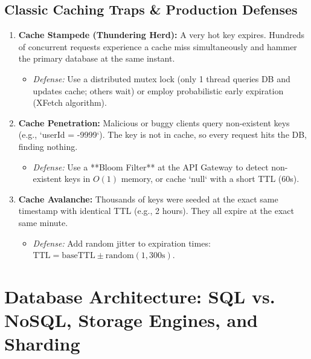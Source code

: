 \documentclass[10pt,journal,compsoc,onecolumn]{IEEEtran}
\begin{document}
\subsection{Classic Caching Traps \& Production Defenses}
\begin{enumerate}
    \item \textbf{Cache Stampede (Thundering Herd):} A very hot key expires. Hundreds of concurrent requests experience a cache miss simultaneously and hammer the primary database at the same instant.
    \begin{itemize}
        \item \emph{Defense:} Use a distributed mutex lock (only 1 thread queries DB and updates cache; others wait) or employ probabilistic early expiration (XFetch algorithm).
    \end{itemize}
    \item \textbf{Cache Penetration:} Malicious or buggy clients query non-existent keys (e.g., `userId = -9999`). The key is not in cache, so every request hits the DB, finding nothing.
    \begin{itemize}
        \item \emph{Defense:} Use a **Bloom Filter** at the API Gateway to detect non-existent keys in $O(1)$ memory, or cache `null` with a short TTL (60s).
    \end{itemize}
    \item \textbf{Cache Avalanche:} Thousands of keys were seeded at the exact same timestamp with identical TTL (e.g., 2 hours). They all expire at the exact same minute.
    \begin{itemize}
        \item \emph{Defense:} Add random jitter to expiration times: $\text{TTL} = \text{baseTTL} \pm \text{random}(1, 300\text{s})$.
    \end{itemize}
\end{enumerate}

\section{Database Architecture: SQL vs. NoSQL, Storage Engines, and Sharding}
\label{sec:databases}
\end{document}

